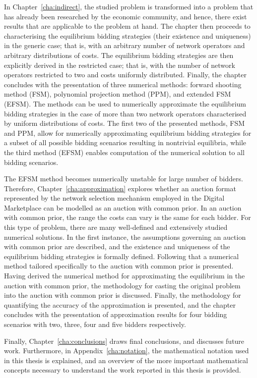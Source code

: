 In Chapter~\ref{cha:indirect}, the studied problem is transformed into a problem that has already been researched by the economic community, and hence, there exist results that are applicable to the problem at hand. The chapter then proceeds to characterising the equilibrium bidding strategies (their existence and uniqueness) in the generic case; that is, with an arbitrary number of network operators and arbitrary distributions of costs. The equilibrium bidding strategies are then explicitly derived in the restricted case; that is, with the number of network operators restricted to two and costs uniformly distributed. Finally, the chapter concludes with the presentation of three numerical methods: forward shooting method (FSM), polynomial projection method (PPM), and extended FSM (EFSM). The methods can be used to numerically approximate the equilibrium bidding strategies in the case of more than two network operators characterised by uniform distributions of costs. The first two of the presented methods, FSM and PPM, allow for numerically approximating equilibrium bidding strategies for a subset of all possible bidding scenarios resulting in nontrivial equilibria, while the third method (EFSM) enables computation of the numerical solution to all bidding scenarios.

The EFSM method becomes numerically unstable for large number of bidders. Therefore, Chapter~\ref{cha:approximation} explores whether an auction format represented by the network selection mechanism employed in the Digital Marketplace can be modelled as an auction with common prior. In an auction with common prior, the range the costs can vary is the same for each bidder. For this type of problem, there are many well-defined and extensively studied numerical solutions. In the first instance, the assumptions governing an auction with common prior are described, and the existence and uniqueness of the equilibrium bidding strategies is formally defined. Following that a numerical method tailored specifically to the auction with common prior is presented. Having derived the numerical method for approximating the equilibrium in the auction with common prior, the methodology for casting the original problem into the auction with common prior is discussed. Finally, the methodology for quantifying the accuracy of the approximation is presented, and the chapter concludes with the presentation of approximation results for four bidding scenarios with two, three, four and five bidders respectively.

Finally, Chapter~\ref{cha:conclusions} draws final conclusions, and discusses future work. Furthermore, in Appendix~\ref{cha:notation}, the mathematical notation used in this thesis is explained, and an overview of the more important mathematical concepts necessary to understand the work reported in this thesis is provided.

